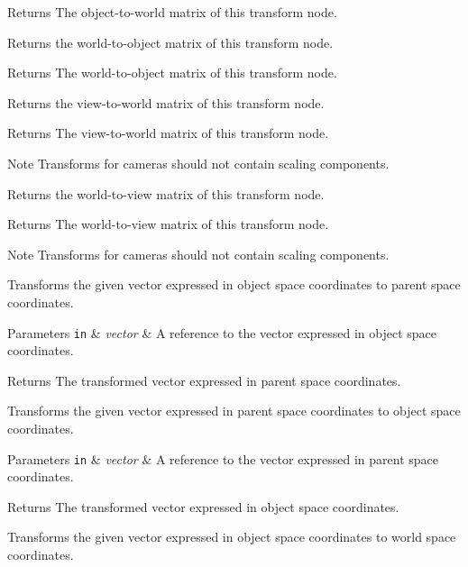 \begin{DoxyReturn}{Returns}
The object-\/to-\/world matrix of this transform node.
\end{DoxyReturn}
Returns the world-\/to-\/object matrix of this transform node.

\begin{DoxyReturn}{Returns}
The world-\/to-\/object matrix of this transform node.
\end{DoxyReturn}
Returns the view-\/to-\/world matrix of this transform node.

\begin{DoxyReturn}{Returns}
The view-\/to-\/world matrix of this transform node. 
\end{DoxyReturn}
\begin{DoxyNote}{Note}
Transforms for cameras should not contain scaling components.
\end{DoxyNote}
Returns the world-\/to-\/view matrix of this transform node.

\begin{DoxyReturn}{Returns}
The world-\/to-\/view matrix of this transform node. 
\end{DoxyReturn}
\begin{DoxyNote}{Note}
Transforms for cameras should not contain scaling components.
\end{DoxyNote}
Transforms the given vector expressed in object space coordinates to parent space coordinates.


\begin{DoxyParams}[1]{Parameters}
\mbox{\tt in}  & {\em vector} & A reference to the vector expressed in object space coordinates. \\
\hline
\end{DoxyParams}
\begin{DoxyReturn}{Returns}
The transformed vector expressed in parent space coordinates.
\end{DoxyReturn}
Transforms the given vector expressed in parent space coordinates to object space coordinates.


\begin{DoxyParams}[1]{Parameters}
\mbox{\tt in}  & {\em vector} & A reference to the vector expressed in parent space coordinates. \\
\hline
\end{DoxyParams}
\begin{DoxyReturn}{Returns}
The transformed vector expressed in object space coordinates.
\end{DoxyReturn}
Transforms the given vector expressed in object space coordinates to world space coordinates.


